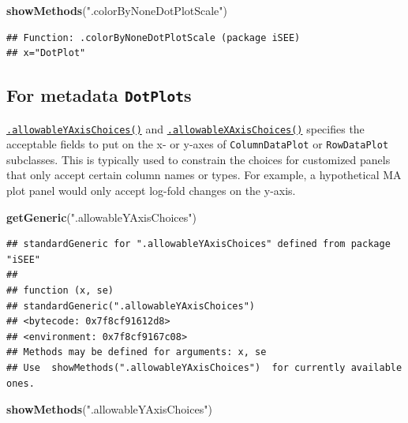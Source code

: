 \documentclass[
]{book}
\newenvironment{Shaded}{\begin{snugshade}}{\end{snugshade}}
\newcommand{\KeywordTok}[1]{\textcolor[rgb]{0.13,0.29,0.53}{\textbf{#1}}}
\newcommand{\NormalTok}[1]{#1}
\newcommand{\StringTok}[1]{\textcolor[rgb]{0.31,0.60,0.02}{#1}}
\begin{document}
\begin{Shaded}
\begin{Highlighting}[]
\KeywordTok{showMethods}\NormalTok{(}\StringTok{".colorByNoneDotPlotScale"}\NormalTok{)}
\end{Highlighting}
\end{Shaded}

\begin{verbatim}
## Function: .colorByNoneDotPlotScale (package iSEE)
## x="DotPlot"
\end{verbatim}

\hypertarget{for-metadata-dotplots}{%
\subsection{\texorpdfstring{For metadata \texttt{DotPlot}s}{For metadata DotPlots}}\label{for-metadata-dotplots}}

\href{https://isee.github.io/iSEE/reference/metadata-plot-generics.html}{\texttt{.allowableYAxisChoices()}} and \href{https://isee.github.io/iSEE/reference/metadata-plot-generics.html}{\texttt{.allowableXAxisChoices()}} specifies the acceptable fields to put on the x- or y-axes of \texttt{ColumnDataPlot} or \texttt{RowDataPlot} subclasses.
This is typically used to constrain the choices for customized panels that only accept certain column names or types.
For example, a hypothetical MA plot panel would only accept log-fold changes on the y-axis.

\begin{Shaded}
\begin{Highlighting}[]
\KeywordTok{getGeneric}\NormalTok{(}\StringTok{".allowableYAxisChoices"}\NormalTok{)}
\end{Highlighting}
\end{Shaded}

\begin{verbatim}
## standardGeneric for ".allowableYAxisChoices" defined from package "iSEE"
## 
## function (x, se) 
## standardGeneric(".allowableYAxisChoices")
## <bytecode: 0x7f8cf91612d8>
## <environment: 0x7f8cf9167c08>
## Methods may be defined for arguments: x, se
## Use  showMethods(".allowableYAxisChoices")  for currently available ones.
\end{verbatim}

\begin{Shaded}
\begin{Highlighting}[]
\KeywordTok{showMethods}\NormalTok{(}\StringTok{".allowableYAxisChoices"}\NormalTok{)}
\end{Highlighting}
\end{Shaded}
\end{document}
